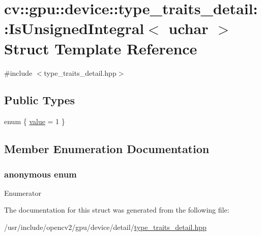 \hypertarget{structcv_1_1gpu_1_1device_1_1type__traits__detail_1_1IsUnsignedIntegral_3_01uchar_01_4}{\section{cv\-:\-:gpu\-:\-:device\-:\-:type\-\_\-traits\-\_\-detail\-:\-:Is\-Unsigned\-Integral$<$ uchar $>$ Struct Template Reference}
\label{structcv_1_1gpu_1_1device_1_1type__traits__detail_1_1IsUnsignedIntegral_3_01uchar_01_4}
}


{\ttfamily \#include $<$type\-\_\-traits\-\_\-detail.\-hpp$>$}

\subsection*{Public Types}
\begin{DoxyCompactItemize}
\item 
enum \{ \hyperlink{structcv_1_1gpu_1_1device_1_1type__traits__detail_1_1IsUnsignedIntegral_3_01uchar_01_4_ab681a7b854de3830805a0dfb6b79fe74ae7dcc6749d4ece407eff18920ced19d0}{value} = 1
 \}
\end{DoxyCompactItemize}


\subsection{Member Enumeration Documentation}
\hypertarget{structcv_1_1gpu_1_1device_1_1type__traits__detail_1_1IsUnsignedIntegral_3_01uchar_01_4_ab681a7b854de3830805a0dfb6b79fe74}{\subsubsection[{anonymous enum}]{\setlength{\rightskip}{0pt plus 5cm}anonymous enum}}\label{structcv_1_1gpu_1_1device_1_1type__traits__detail_1_1IsUnsignedIntegral_3_01uchar_01_4_ab681a7b854de3830805a0dfb6b79fe74}
\begin{Desc}
\item[Enumerator]\par
\begin{description}
\item[{\em 
\hypertarget{structcv_1_1gpu_1_1device_1_1type__traits__detail_1_1IsUnsignedIntegral_3_01uchar_01_4_ab681a7b854de3830805a0dfb6b79fe74ae7dcc6749d4ece407eff18920ced19d0}{value}\label{structcv_1_1gpu_1_1device_1_1type__traits__detail_1_1IsUnsignedIntegral_3_01uchar_01_4_ab681a7b854de3830805a0dfb6b79fe74ae7dcc6749d4ece407eff18920ced19d0}
}]\end{description}
\end{Desc}


The documentation for this struct was generated from the following file\-:\begin{DoxyCompactItemize}
\item 
/usr/include/opencv2/gpu/device/detail/\hyperlink{type__traits__detail_8hpp}{type\-\_\-traits\-\_\-detail.\-hpp}\end{DoxyCompactItemize}

